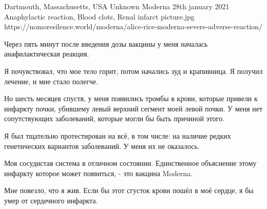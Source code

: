           {Dartmouth, Massachusetts, USA}
          {Unknown}
          {Moderna}
          {28th january 2021}
          {Anaphylactic reaction, Blood clots, Renal infarct
          }
          {picture.jpg}
          {https://nomoresilence.world/moderna/alice-rice-moderna-severe-adverse-reaction/}
          {

Через пять минут после введения дозы вакцины у меня началась анафилактическая
реакция.

Я почувствовал, что мое тело горит, потом начались зуд и крапивница. Я получил
лечение, и мне стало полегче.

Но шесть месяцев спустя, у меня появились тромбы в крови, которые привели к
инфаркту почки, убившему левый верхний сегмент моей левой почки. У меня нет
сопутствующих заболеваний, которые могли бы быть причиной этого.

Я был тщательно протестирован на всё, в том числе: на наличие редких
генетических вариантов заболеваний. У меня их не оказалось.

Моя сосудистая система в отличном состоянии. Единственное объяснение этому
инфаркту которое может появиться, - это вакцина Moderna.

Мне повезло, что я жив. Если бы этот сгусток крови пошёл в моё сердце, я бы умер
от сердечного инфаркта.

}
